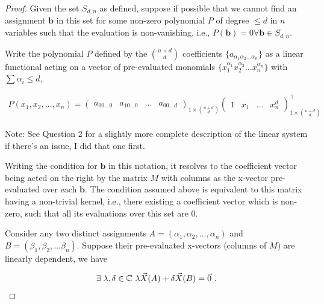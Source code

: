 \question

\begin{proof}
        Given the set \(S_{d, n}\) as defined, suppose if possible that we
        cannot find an assignment \(\mathbf{b}\) in this set for some non-zero
        polynomial \(P\) of degree \(\leq d\) in \(n\) variables such that the
        evaluation is non-vanishing, i.e., \(P(\mathbf{b}) = 0
        \forall\mathbf{b}\in S_{d, n}\).

        Write the polynomial \(P\) defined by the \(\binom{n+d}{d}\)
        coefficients \(\{a_{\alpha_1\alpha_2\ldots\alpha_n}\}\) as a linear
        functional acting on a vector of pre-evaluated monomials
        \(\{x_1^{\alpha_1}x_2^{\alpha_2}\ldots x_n^{\alpha_n}\}\) with \(\sum
        \alpha_i \leq d\),

        \begin{gather*}
            P(x_1, x_2, \ldots, x_n) = 
            \begin{pmatrix}
                a_{00\ldots 0} & a_{10\ldots 0} & \ldots & a_{00\ldots d}
            \end{pmatrix}_{1\times \binom{n+d}{d}}
            \begin{pmatrix}
                1 & x_1 & \ldots & x_n^d
            \end{pmatrix}^\top_{1\times \binom{n+d}{d}}
        \end{gather*}

        Note: See Question 2 for a slightly more complete description of the linear
        system if there's an issue, I did that one first.

        Writing the condition for \(\mathbf{b}\) in this notation, it resolves
        to the coefficient vector being acted on the right by the matrix \(M\)
        with columns as the x-vector pre-evaluated over each \(\mathbf{b}\). The
        condition assumed above is equivalent to this matrix having a
        non-trivial kernel, i.e., there existing a coefficient vector which is
        non-zero, such that all its evaluations over this set are 0.

        Consider any two distinct assignments \(A = (\alpha_1, \alpha_2, \ldots,
        \alpha_n)\) and \(B = (\beta_1, \beta_2, \ldots \beta_n)\). Suppose
        their pre-evaluated x-vectors (columns of \(M\)) are linearly dependent,
        we have

        \begin{gather*}
           \exists\;\lambda, \delta \in \mathbb{C} ~\lambda \vec{X}(A) + \delta \vec{X}(B) = \vec{0}~.
        \end{gather*}


\end{proof}
